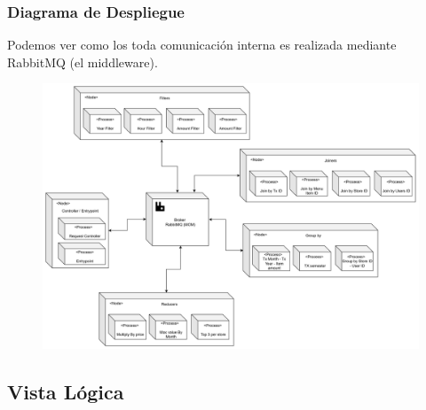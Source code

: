 \documentclass[titlepage,a4paper]{article}
\begin{document}
\subsubsection{Diagrama de Despliegue}

Podemos ver como los toda comunicación interna es realizada mediante RabbitMQ (el middleware).

\begin{figure}[H]
    \centering
    \includegraphics[width=1\linewidth]{despliegue.png}
\end{figure}


\subsection{Vista Lógica}
\end{document}
